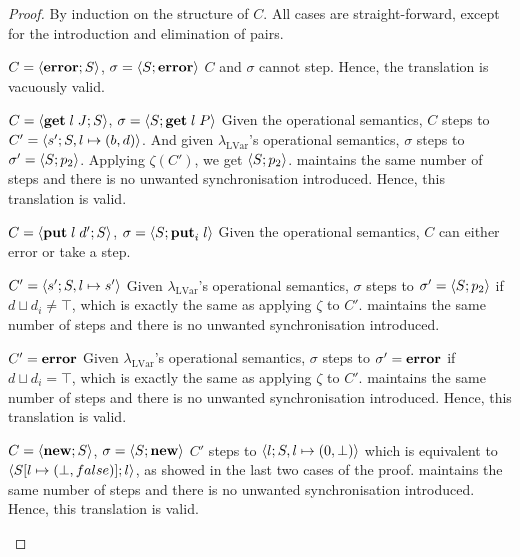 \documentclass[main.tex]{subfiles}
\begin{document}
\begin{proof}
  By induction on the structure of $C$. All cases are straight-forward, except
  for the introduction and elimination of pairs.

  \begin{case}{%
      $C = \langle {\ensuremath{\mathbf{error}}}; {S} \rangle$,
      $\sigma = \langle {S}; {\mathbf{error}} \rangle$}
    $C$ and $\sigma$ cannot step. Hence, the translation is vacuously valid.
  \end{case}

  \begin{case}{%
      $C = \langle {\ensuremath{\mathbf{get}}\;l\;J}; {S} \rangle$,
      $\sigma = \langle {S}; {\mathbf{get}\;l\;P} \rangle$}
    Given the operational semantics, $C$ steps to $C' = \langle {s'}; {S, l \mapsto (b, d)} \rangle$. And given $\lambda_{\text{LVar}}$'s operational semantics, $\sigma$ steps to $\sigma' = \langle {S}; {p_2} \rangle$. Applying $\zeta (C')$, we get $\langle {S}; {p_2} \rangle$. \typedlambdalvar maintains the same number of steps and there is no unwanted synchronisation introduced. Hence, this translation is valid.
  \end{case}

  \begin{case}{%
      $C = \langle {\ensuremath{\mathbf{put}}\;l\;d'}; {S} \rangle$,
      $\sigma = \langle {S}; {\mathbf{put}_{i}\;l} \rangle$}
    Given the operational semantics, $C$ can either error or take a step.
    \begin{subcase}{$C' = \langle {s'}; {S, l \mapsto s'} \rangle$}
      Given $\lambda_{\text{LVar}}$'s operational semantics, $\sigma$ steps to $\sigma' = \langle {S}; {p_2} \rangle$ if $d \sqcup d_{i} \neq \top$, which is exactly the same as applying $\zeta$ to $C'$. \typedlambdalvar maintains the same number of steps and there is no unwanted synchronisation introduced.
    \end{subcase}
    \begin{subcase}{$C' = \mathbf{error}$}
      Given $\lambda_{\text{LVar}}$'s operational semantics, $\sigma$ steps to $\sigma' = \mathbf{error}$ if $d \sqcup d_{i} = \top$, which is exactly the same as applying $\zeta$ to $C'$. \typedlambdalvar maintains the same number of steps and there is no unwanted synchronisation introduced. Hence, this translation is valid.
    \end{subcase}
  \end{case}

  \begin{case}{%
      $C = \langle {\ensuremath{\mathbf{new}}}; {S} \rangle$,
      $\sigma = \langle {S}; {\mathbf{new}} \rangle$}
    $C'$ steps to $\langle {l}; {S, l \mapsto (0, \bot)} \rangle$ which is equivalent to $\langle {S[l \mapsto (\bot, false)]}; {l} \rangle$, as showed in the last two cases of the proof. \typedlambdalvar maintains the same number of steps and there is no unwanted synchronisation introduced. Hence, this translation is valid.
  \end{case}


\end{proof}
\end{document}
